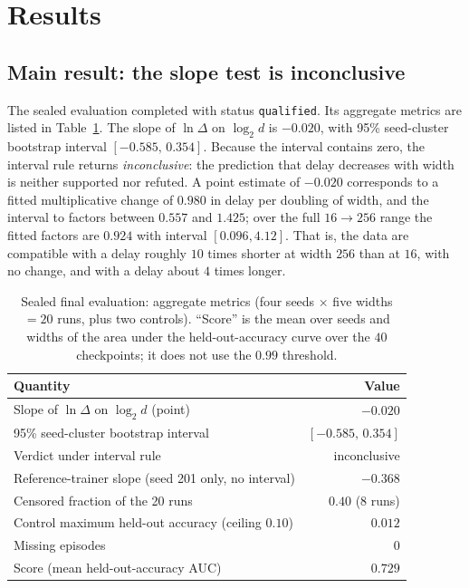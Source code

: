 \documentclass{article}
\begin{document}
\section{Results}
\label{sec:results}

\subsection{Main result: the slope test is inconclusive}
The sealed evaluation completed with status \texttt{qualified}. Its aggregate metrics are listed in Table~\ref{tab:metrics}.
The slope of $\ln\Delta$ on $\log_2 d$ is $-0.020$, with 95\% seed-cluster bootstrap interval $[-0.585,\,0.354]$. Because the interval contains zero, the interval rule returns \emph{inconclusive}: the prediction that delay decreases with width is neither supported nor refuted. A point estimate of $-0.020$ corresponds to a fitted multiplicative change of $0.980$ in delay per doubling of width, and the interval to factors between $0.557$ and $1.425$; over the full $16\to256$ range the fitted factors are $0.924$ with interval $[0.096, 4.12]$.
That is, the data are compatible with a delay roughly $10$ times shorter at width $256$ than at $16$, with no change, and with a delay about $4$ times longer.

\begin{table}[t]
\centering
\caption{Sealed final evaluation: aggregate metrics (four seeds $\times$ five widths $=20$ runs, plus two controls). ``Score'' is the mean over seeds and widths of the area under the held-out-accuracy curve over the $40$ checkpoints; it does not use the $0.99$ threshold.}
\label{tab:metrics}
\small
\begin{tabular}{lr}
\toprule
Quantity & Value \\
\midrule
Slope of $\ln\Delta$ on $\log_2 d$ (point) & $-0.020$ \\
95\% seed-cluster bootstrap interval & $[-0.585,\,0.354]$ \\
Verdict under interval rule & inconclusive \\
Reference-trainer slope (seed 201 only, no interval) & $-0.368$ \\
Censored fraction of the 20 runs & $0.40$ ($8$ runs) \\
Control maximum held-out accuracy (ceiling $0.10$) & $0.012$ \\
Missing episodes & $0$ \\
Score (mean held-out-accuracy AUC) & $0.729$ \\
\bottomrule
\end{tabular}
\end{table}
\end{document}
